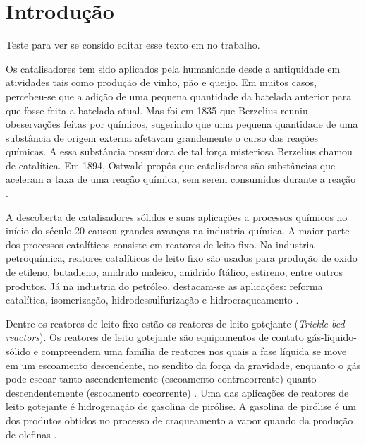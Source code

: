 %
% 
%
\chapter{Introdução} \label{chap:introduction}


Teste para ver se consido editar esse texto em no trabalho.

Os catalisadores tem sido aplicados pela humanidade desde a antiquidade
em atividades tais como produção de vinho, pão e queijo. Em muitos
casos, percebeu-se que a adição de uma pequena quantidade da batelada anterior
para que fosse feita a batelada atual. Mas foi em 1835 que Berzelius reuniu
obeservações feitas por químicos, sugerindo que uma pequena quantidade de
uma substância de origem externa afetavam grandemente o
curso das reações químicas. A essa substância possuidora de tal força
misteriosa Berzelius chamou de catalítica. Em 1894, Ostwald propôs que
catalisdores são substâncias que aceleram a taxa de uma reação química, sem
serem consumidos durante a reação \cite{Oyama1988}.

A descoberta de catalisadores sólidos e suas aplicações a processos químicos no
início do século 20 causou grandes avanços na industria química. A maior parte
dos processos catalíticos consiste em reatores de leito fixo. Na industria
petroquímica, reatores catalíticos de leito fixo são usados para produção de
oxido de etileno, butadieno, anidrido maleico, anidrido ftálico, estireno,
entre outros produtos. Já na industria do petróleo, destacam-se as aplicações:
reforma catalítica, isomerização, hidrodessulfurização e hidrocraqueamento
\cite{Froment2011}.

Dentre os reatores de leito fixo estão os reatores de leito gotejante
(\emph{Trickle bed reactors}). Os reatores de leito gotejante são
equipamentos de contato gás-líquido-sólido e compreendem uma família de
reatores nos quais a fase líquida se move em um escoamento descendente, no
sendito da força da gravidade, enquanto o gás pode escoar tanto ascendentemente
(escoamento contracorrente) quanto descendentemente (escoamento cocorrente)
\cite{Ranade2011}. Uma das aplicações de reatores de leito gotejante é
hidrogenação de gasolina de pirólise. A gasolina de pirólise é um dos produtos obtidos no processo de
craqueamento a vapor quando da produção de olefinas \cite{Cheng1986}.

